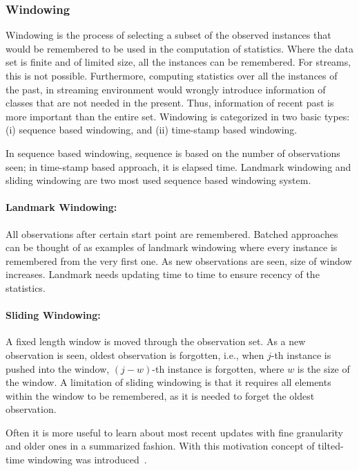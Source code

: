 \subsubsection{Windowing}
Windowing is the process of selecting a subset of the observed instances that would be remembered to be used in the computation of statistics. Where the data set is finite and of limited size, all the instances can be remembered. For streams, this is not possible. Furthermore, computing statistics over all the instances of the past, in streaming environment would wrongly introduce information of classes that are not needed in the present. Thus, information of recent past is more important than the entire set. Windowing is categorized in two basic types: (i) sequence based windowing, and (ii) time-stamp based windowing.

In sequence based windowing, sequence is based on the number of observations seen; in time-stamp based approach, it is elapsed time. Landmark windowing and sliding windowing are two most used sequence based windowing system.

\paragraph{Landmark Windowing:} All observations after certain start point are remembered. Batched approaches can be thought of as examples of landmark windowing where every instance is remembered from the very first one. As new observations are seen, size of window increases. Landmark needs updating time to time to ensure recency of the statistics.

\paragraph{Sliding Windowing:} A fixed length window is moved through the observation set. As a new observation is seen, oldest observation is forgotten, i.e., when $j$-th instance is pushed into the window, $(j-w)$-th instance is forgotten, where $w$ is the size of the window. A limitation of sliding windowing is that it requires all elements within the window to be remembered, as it is needed to forget the oldest observation.

Often it is more useful to learn about most recent updates with fine granularity and older ones in a summarized fashion. With this motivation concept of tilted-time windowing was introduced~\cite{chen02:tiltedtime}.

